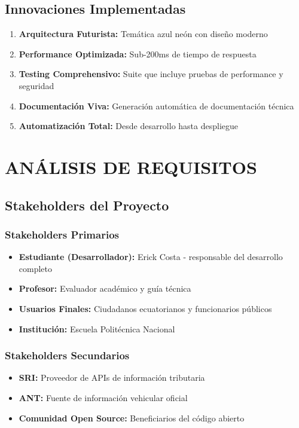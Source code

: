 \documentclass[12pt,a4paper]{article}
\begin{document}
\subsection{Innovaciones Implementadas}

\begin{enumerate}
    \item \textbf{Arquitectura Futurista:} Temática azul neón con diseño moderno
    \item \textbf{Performance Optimizada:} Sub-200ms de tiempo de respuesta
    \item \textbf{Testing Comprehensivo:} Suite que incluye pruebas de performance y seguridad
    \item \textbf{Documentación Viva:} Generación automática de documentación técnica
    \item \textbf{Automatización Total:} Desde desarrollo hasta despliegue
\end{enumerate}

\section{ANÁLISIS DE REQUISITOS}

\subsection{Stakeholders del Proyecto}

\subsubsection{Stakeholders Primarios}

\begin{itemize}
    \item \textbf{Estudiante (Desarrollador):} Erick Costa - responsable del desarrollo completo
    \item \textbf{Profesor:} Evaluador académico y guía técnica
    \item \textbf{Usuarios Finales:} Ciudadanos ecuatorianos y funcionarios públicos
    \item \textbf{Institución:} Escuela Politécnica Nacional
\end{itemize}

\subsubsection{Stakeholders Secundarios}

\begin{itemize}
    \item \textbf{SRI:} Proveedor de APIs de información tributaria
    \item \textbf{ANT:} Fuente de información vehicular oficial
    \item \textbf{Comunidad Open Source:} Beneficiarios del código abierto
\end{itemize}
\end{document}
